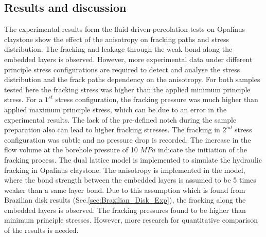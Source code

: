\subsection{Results and discussion}
The experimental results form the fluid driven percolation tests on Opalinus claystone show the effect of the anisotropy on fracking paths and stress distribution. The fracking and leakage through the weak bond along the embedded layers is observed. However, more experimental data under different principle stress configurations are required to detect and analyse the stress distribution and the frack paths dependency on the anisotropy. For both samples tested here the fracking stress was higher than the applied minimum principle stress. For a $1^{st}$ stress configuration, the fracking pressure was much higher than applied maximum principle stress, which can be due to an error in the experimental results. The lack of the pre-defined notch during the sample preparation also can lead to higher fracking stresses. The fracking in $2^{nd}$ stress configuration was subtle and no pressure drop is recorded. The increase in the flow volume at the borehole pressure of 10 $MPa$ indicate the initiation of the fracking process. The dual lattice model is implemented to simulate the hydraulic fracking in Opalinus claystone. The anisotropy is implemented in the model, where the bond strength between the embedded layers is assumed to be 5 times weaker than a same layer bond. Due to this assumption which is found from Brazilian disk results (Sec.\ref{sec:Brazilian_Disk_Exp}), the fracking along the embedded layers is observed. The fracking pressures found to be higher than minimum principle stresses. However, more research for quantitative comparison of the results is needed. 
